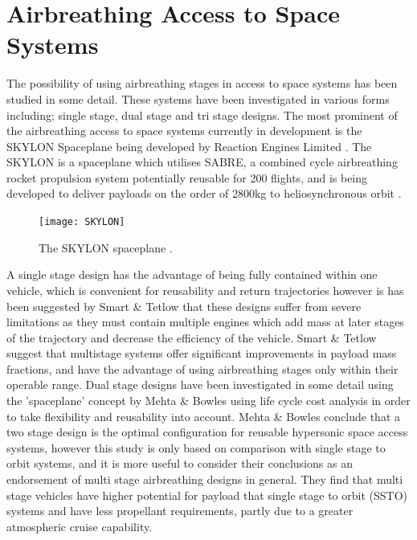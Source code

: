 \section{Airbreathing Access to Space Systems}


The possibility of using airbreathing stages in access to space systems has been studied in some detail. These systems have been investigated in various forms including; single stage\cite{Powell1991,Wilhite1991,Varvill2008}, dual stage \cite{Tsuchiya2005}\cite{Mehta2001} and tri stage \cite{Preller2017} designs. The most prominent of the airbreathing access to space systems currently in development is the SKYLON Spaceplane being developed by Reaction Engines Limited \cite{Varvill2004}. The SKYLON is a spaceplane which utilises SABRE, a combined cycle airbreathing rocket propulsion system potentially reusable for 200 flights, and is being developed to deliver payloads on the order of 2800kg to heliosynchronous orbit \cite{Sky-rel-ma-}.

\begin{figure}[ht]
	\centering
	\texttt{[image: SKYLON]}
	\caption{The SKYLON spaceplane \cite{Varvill2008}.}
	\label{fig:SKYLON}
\end{figure}
A single stage design has the advantage of being fully contained within one vehicle, which is convenient for reusability and return trajectories however is has been suggested by Smart \& Tetlow \cite{Smart2009} that these designs suffer from severe limitations as they must contain multiple engines which add mass at later stages of the trajectory and decrease the efficiency of the vehicle. Smart \& Tetlow suggest that multistage systems offer significant improvements in payload mass fractions, and have the advantage of using airbreathing stages only within their operable range.
Dual stage designs have been investigated in some detail using the 'spaceplane' concept by Mehta \& Bowles \cite{Mehta2001} using life cycle cost analysis in order to take flexibility and reusability into account. Mehta \& Bowles conclude that a two stage design is the optimal configuration for reusable hypersonic space access systems, however this study is only based on comparison with single stage to orbit systems, and it is more useful to consider their conclusions as an endorsement of multi stage airbreathing designs in general. They find that multi stage vehicles have higher potential for payload that single stage to orbit (SSTO) systems and have less propellant requirements, partly due to a greater atmospheric cruise capability. 




